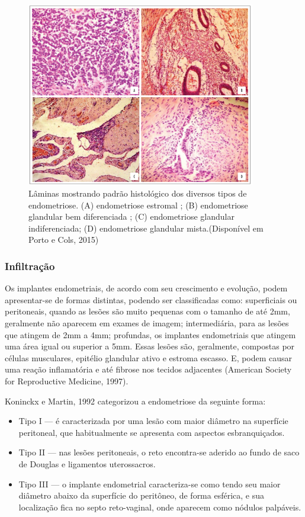 \documentclass[12pt]{article} %
\begin{document}
\begin{figure}[h!]
\centering
\includegraphics[width=10cm]{citoendometriose1636.jpg}
\caption[Amostras histológicas de diversos tipos de endometriose]{Lâminas mostrando padrão histológico dos diversos tipos de endometriose. (A) endometriose estromal ; (B) endometriose glandular bem diferenciada ; (C) endometriose glandular indiferenciada; (D) endometriose glandular mista.(Disponível em Porto e Cols, 2015)}
\label{histologico}
\end{figure} 


\subsubsection{Infiltração}

Os implantes endometriais, de acordo com seu crescimento e evolução,
podem apresentar-se de formas distintas, podendo ser classificadas
como: superficiais ou peritoneais, quando as lesões são muito pequenas
com o tamanho de até 2mm, geralmente não aparecem em exames de imagem;
intermediária, para as lesões que atingem de 2mm a 4mm; profundas, os
implantes endometriais que atingem uma área igual ou superior a 5mm.
Essas lesões são, geralmente, compostas por células musculares,
epitélio glandular ativo e estroma escasso. E, podem causar uma reação
inflamatória e até fibrose nos tecidos adjacentes (American Society
for Reproductive Medicine, 1997).

Koninckx e Martin, 1992 categorizou a endometriose da seguinte forma:

\begin{itemize}
\item Tipo I --- é caracterizada por uma lesão com maior diâmetro na
  superfície peritoneal, que habitualmente se apresenta com aspectos
  esbranquiçados.
\item Tipo II --- nas lesões peritoneais, o reto encontra-se aderido ao
  fundo de saco de Douglas e ligamentos uterossacros.
\item Tipo III --- o implante endometrial caracteriza-se como tendo
  seu maior diâmetro abaixo da superfície do peritôneo, de forma
  esférica, e sua localização fica no septo reto-vaginal, onde
  aparecem como nódulos palpáveis.
\end{itemize}
\end{document}
